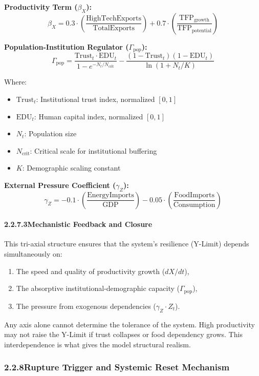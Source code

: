 \documentclass[12pt]{report}
\begin{document}
\textbf{Productivity Term ($\beta_X$):}
\[
\beta_X = 0.3 \cdot \left(\frac{\text{HighTechExports}}{\text{TotalExports}}\right)
+ 0.7 \cdot \left(\frac{\text{TFP}_{\text{growth}}}{\text{TFP}_{\text{potential}}}\right)
\]

\textbf{Population-Institution Regulator ($\Gamma_{\text{pop}}$):}
\[
\Gamma_{\text{pop}} = 
\frac{\text{Trust}_t \cdot \text{EDU}_t}{1 - e^{-N_t / N_{\text{crit}}}} 
- \frac{(1 - \text{Trust}_t)(1 - \text{EDU}_t)}{\ln(1 + N_t / K)}
\]

Where:
\begin{itemize}
  \item $\text{Trust}_t$: Institutional trust index, normalized $[0, 1]$
  \item $\text{EDU}_t$: Human capital index, normalized $[0, 1]$
  \item $N_t$: Population size
  \item $N_{\text{crit}}$: Critical scale for institutional buffering
  \item $K$: Demographic scaling constant
\end{itemize}

\textbf{External Pressure Coefficient ($\gamma_Z$):}
\[
\gamma_Z = -0.1 \cdot \left( \frac{\text{EnergyImports}}{\text{GDP}} \right)
- 0.05 \cdot \left( \frac{\text{FoodImports}}{\text{Consumption}} \right)
\]

\paragraph{2.2.7.3\quad Mechanistic Feedback and Closure}

This tri-axial structure ensures that the system’s resilience (Y-Limit) depends simultaneously on:

\begin{enumerate}
  \item The speed and quality of productivity growth ($dX/dt$),
  \item The absorptive institutional-demographic capacity ($\Gamma_{\text{pop}}$),
  \item The pressure from exogenous dependencies ($\gamma_Z \cdot Z_t$).
\end{enumerate}

Any axis alone cannot determine the tolerance of the system. High productivity may not raise the Y-Limit if trust collapses or food dependency grows. This interdependence is what gives the model structural realism.

\subsubsection{2.2.8\quad Rupture Trigger and Systemic Reset Mechanism}
\end{document}
